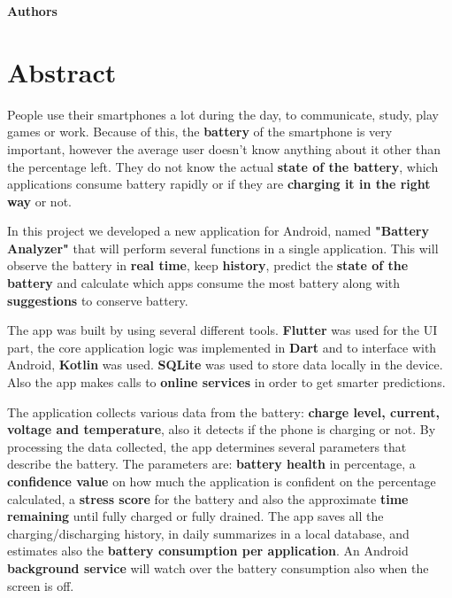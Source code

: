 \documentclass[12pt,a4paper]{report}
\begin{document}
\vspace{24pt}
\begin{flushright}
\textbf{Authors}
\end{flushright}
\clearpage

\chapter*{Abstract}

People use their smartphones a lot during the day, to communicate, study, play games or work. Because of this, the \textbf{battery} of the smartphone is very important, however the average user doesn't know anything about it other than the percentage left. They do not know the actual \textbf{state of the battery}, which applications consume battery rapidly or if they are \textbf{charging it in the right way} or not.

In this project we developed a new application for Android, named \textbf{"Battery Analyzer"} that will perform several functions in a single application. This will observe the battery in \textbf{real time}, keep \textbf{history}, predict the \textbf{state of the battery} and calculate which apps consume the most battery along with \textbf{suggestions} to conserve battery.

The app was built by using several different tools. \textbf{Flutter} was used for the UI part, the core application logic was implemented in \textbf{Dart} and to interface with Android, \textbf{Kotlin} was used. \textbf{SQLite} was used to store data locally in the device. Also the app makes calls to \textbf{online services} in order to get smarter predictions.

The application collects various data from the battery: \textbf{charge level, current, voltage and temperature}, also it detects if the phone is charging or not. By processing the data collected, the app determines several parameters that describe the battery. The parameters are: \textbf{battery health} in percentage, a \textbf{confidence value} on how much the application is confident on the percentage calculated, a \textbf{stress score} for the battery and also the approximate \textbf{time remaining} until fully charged or fully drained. The app saves all the charging/discharging history, in daily summarizes in a local database, and estimates also the \textbf{battery consumption per application}. An Android \textbf{background service} will watch over the battery consumption also when the screen is off.
\end{document}
